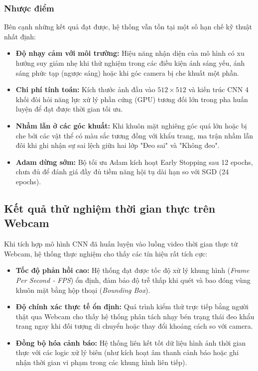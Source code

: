 \documentclass[a4paper,12pt]{article}
\begin{document}
\subsubsection{Nhược điểm}
Bên cạnh những kết quả đạt được, hệ thống vẫn tồn tại một số hạn chế kỹ thuật nhất định:
\begin{itemize}
    \item \textbf{Độ nhạy cảm với môi trường:} Hiệu năng nhận diện của mô hình có xu hướng suy giảm nhẹ khi thử nghiệm trong các điều kiện ánh sáng yếu, ánh sáng phức tạp (ngược sáng) hoặc khi góc camera bị che khuất một phần.
    \item \textbf{Chi phí tính toán:} Kích thước ảnh đầu vào $512\times512$ và kiến trúc CNN 4 khối đòi hỏi năng lực xử lý phần cứng (GPU) tương đối lớn trong pha huấn luyện để đạt được thời gian tối ưu.
    \item \textbf{Nhầm lẫn ở các góc khuất:} Khi khuôn mặt nghiêng góc quá lớn hoặc bị che bởi các vật thể có màu sắc tương đồng với khẩu trang, ma trận nhầm lẫn đôi khi ghi nhận sự sai lệch giữa hai lớp "Đeo sai" và "Không đeo".
    \item \textbf{Adam dừng sớm:} Bộ tối ưu Adam kích hoạt Early Stopping sau 12 epochs, chưa đủ để đánh giá đầy đủ tiềm năng hội tụ dài hạn so với SGD (24 epochs).
\end{itemize}

\subsection{Kết quả thử nghiệm thời gian thực trên Webcam}
Khi tích hợp mô hình CNN đã huấn luyện vào luồng video thời gian thực từ Webcam, hệ thống thực nghiệm cho thấy các tín hiệu rất tích cực:
\begin{itemize}
    \item \textbf{Tốc độ phản hồi cao:} Hệ thống đạt được tốc độ xử lý khung hình (\textit{Frame Per Second - FPS}) ổn định, đảm bảo độ trễ thấp khi quét và bao đóng vùng khuôn mặt bằng hộp thoại (\textit{Bounding Box}).
    \item \textbf{Độ chính xác thực tế ổn định:} Quá trình kiểm thử trực tiếp bằng người thật qua Webcam cho thấy hệ thống phân tách nhạy bén trạng thái đeo khẩu trang ngay khi đối tượng di chuyển hoặc thay đổi khoảng cách so với camera.
    \item \textbf{Đồng bộ hóa cảnh báo:} Hệ thống liên kết tốt dữ liệu hình ảnh thời gian thực với các logic xử lý biên (như kích hoạt âm thanh cảnh báo hoặc ghi nhận thời gian vi phạm trong các khung hình liên tiếp).
\end{itemize}
\end{document}
